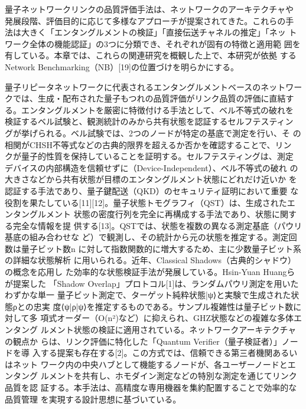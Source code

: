 \documentclass[conference]{IEEEtran}
\begin{document}
量子ネットワークリンクの品質評価手法は、ネットワークのアーキテクチャや
発展段階、評価目的に応じて多様なアプローチが提案されてきた。これらの手
法は大きく「エンタングルメントの検証」「直接伝送チャネルの推定」「ネッ
トワーク全体の機能認証」の3つに分類でき、それぞれが固有の特徴と適用範
囲を有している。本章では、これらの関連研究を概観した上で、本研究が依拠
するNetwork Benchmarking（NB）[19]の位置づけを明らかにする。

量子リピータネットワークに代表されるエンタングルメントベースのネットワー
クでは、生成・配布された量子もつれの品質評価がリンク品質の評価に直結す
る。エンタングルメントを厳密に特徴付ける手法として、ベル不等式の破れを
検証するベル試験と、観測統計のみから共有状態を認証するセルフテスティン
グが挙げられる。ベル試験では、2つのノードが特定の基底で測定を行い、そ
の相関がCHSH不等式などの古典的限界を超えるか否かを確認することで、リン
クが量子的性質を保持していることを証明する。セルフテスティングは、測定
デバイスの内部構造を信頼せずに（Device-Independent）、ベル不等式の破れ
の大きさなどから共有状態が目標のエンタングルメント状態にどれだけ近いか
を認証する手法であり、量子鍵配送（QKD）のセキュリティ証明において重要
な役割を果たしている[11][12]。量子状態トモグラフィ（QST）は、生成されたエンタングルメント
状態の密度行列を完全に再構成する手法であり、状態に関する完全な情報を提
供する[13]。QSTでは、状態を複数の異なる測定基底（パウリ基底の組み合わせな
ど）で観測し、その統計から元の状態を推定する。測定回数は量子ビット数n
に対して指数関数的に増大するため、主に少数量子ビット系の詳細な状態解析
に用いられる。近年、Classical Shadows（古典的シャドウ）の概念を応用し
た効率的な状態検証手法が発展している。Hsin-Yuan Huangらが提案した
「Shadow Overlap」プロトコル[1]は、ランダムパウリ測定を用いたわずかな単一
量子ビット測定で、ターゲット純粋状態|ψ⟩と実験で生成された状態ρとの忠実
度⟨ψ|ρ|ψ⟩を推定するものである。サンプル複雑性は量子ビット数に対して多
項式オーダー（O(n²)など）に抑えられ、GHZ状態などの複雑な多体エンタング
ルメント状態の検証に適用されている。ネットワークアーキテクチャの観点か
らは、リンク評価に特化した「Quantum Verifier（量子検証者）」ノードを導
入する提案も存在する[2]。この方式では、信頼できる第三者機関あるいはネット
ワーク内の中央ハブとして機能するノードが、各ユーザーノードとエンタング
ルメントを共有し、ホモダイン測定などの特別な測定を通じてリンク品質を認
証する。本手法は、高精度な専用機器を集約配置することで効率的な品質管理
を実現する設計思想に基づいている。
\end{document}
